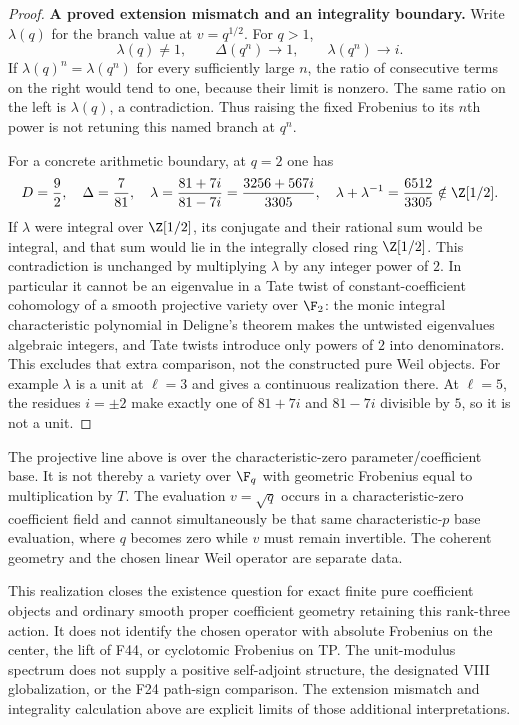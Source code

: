 \documentclass[11pt,a4paper]{article}
\newcommand{\fid}[1]{\textsf{#1}}\newcommand{\gate}[1]{\textsf{#1}}
\theoremstyle{named}\newtheorem{finding}{Finding}[section]
\theoremstyle{definition}\newtheorem{definition}[finding]{Definition}
\theoremstyle{remark}\newtheorem{remark}[finding]{Remark}
\begin{document}
\begin{proof}
\par\smallskip\noindent\textbf{A proved extension mismatch and an integrality boundary.}\quad
Write $\lambda(q)$ for the branch value at $v=q^{1/2}$.
For $q>1$,
\[
 \lambda(q)\ne1,\qquad
 \Delta(q^n)\longrightarrow1,\qquad
 \lambda(q^n)\longrightarrow i.
\]
If $\lambda(q)^n=\lambda(q^n)$ for every sufficiently
large $n$, the ratio of consecutive terms on the right
would tend to one, because their limit is nonzero.
The same ratio on the left is $\lambda(q)$, a contradiction.
Thus raising the fixed Frobenius to its $n$th power is
not retuning this named branch at $q^n$.

For a concrete arithmetic boundary, at $q=2$ one has
\[
 D=\frac92,\quad \Delta=\frac7{81},\quad
 \lambda=\frac{81+7i}{81-7i}
       =\frac{3256+567i}{3305},\quad
 \lambda+\lambda^{-1}=\frac{6512}{3305}\notin\Z[1/2].
\]
If $\lambda$ were integral over $\Z[1/2]$, its conjugate
and their rational sum would be integral, and that sum
would lie in the integrally closed ring $\Z[1/2]$.
This contradiction is unchanged by multiplying $\lambda$
by any integer power of $2$.
In particular it cannot be an eigenvalue in a Tate twist
of constant-coefficient cohomology of a smooth projective
variety over $\F_2$: the monic integral characteristic
polynomial in Deligne's theorem
\cite[Theorem~(1.6), p.~276; argument on pp.~276--277]{WeilI}
makes the untwisted eigenvalues algebraic integers, and
Tate twists introduce only powers of $2$ into denominators.
This excludes that extra comparison, not the constructed
pure Weil objects. For example $\lambda$ is a unit at
$\ell=3$ and gives a continuous realization there.
At $\ell=5$, the residues $i=\pm2$ make exactly one of
$81+7i$ and $81-7i$ divisible by $5$, so it is not a unit.
\end{proof}

The projective line above is over the characteristic-zero
parameter/coefficient base. It is not thereby a variety
over $\F_q$ with geometric Frobenius equal to multiplication
by $T$. The evaluation $v=\sqrt q$ occurs in a characteristic-zero
coefficient field and cannot simultaneously be that same
characteristic-$p$ base evaluation, where $q$ becomes zero
while $v$ must remain invertible. The coherent geometry and
the chosen linear Weil operator are separate data.

This realization closes the existence question for exact
finite pure coefficient objects and ordinary smooth proper
coefficient geometry retaining this rank-three action.
It does not identify the chosen operator with absolute
Frobenius on the center, the lift of \fid{F44}, or cyclotomic
Frobenius on TP. The unit-modulus spectrum does not supply
a positive self-adjoint structure, the designated VIII
globalization, or the \fid{F24} path-sign comparison.
The extension mismatch and integrality calculation above
are explicit limits of those additional interpretations.
\end{document}

